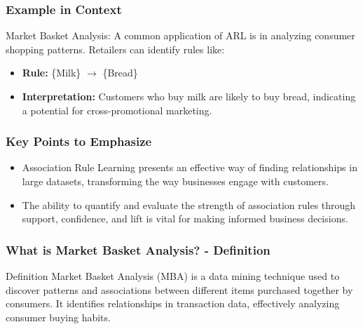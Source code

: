 \documentclass[aspectratio=169]{beamer}
\begin{document}
\begin{frame}[fragile]
    \frametitle{Example in Context}
    \begin{block}{Market Basket Analysis:}
        A common application of ARL is in analyzing consumer shopping patterns. Retailers can identify rules like:
        \begin{itemize}
            \item \textbf{Rule:} \{Milk\} $\rightarrow$ \{Bread\}
            \item \textbf{Interpretation:} Customers who buy milk are likely to buy bread, indicating a potential for cross-promotional marketing.
        \end{itemize}
    \end{block}
\end{frame}

\begin{frame}[fragile]
    \frametitle{Key Points to Emphasize}
    \begin{itemize}
        \item Association Rule Learning presents an effective way of finding relationships in large datasets, transforming the way businesses engage with customers.
        \item The ability to quantify and evaluate the strength of association rules through support, confidence, and lift is vital for making informed business decisions.
    \end{itemize}
\end{frame}

\begin{frame}[fragile]
    \frametitle{What is Market Basket Analysis? - Definition}
    \begin{block}{Definition}
        Market Basket Analysis (MBA) is a data mining technique used to discover patterns and associations between different items purchased together by consumers. It identifies relationships in transaction data, effectively analyzing consumer buying habits.
    \end{block}
\end{frame}
\end{document}

